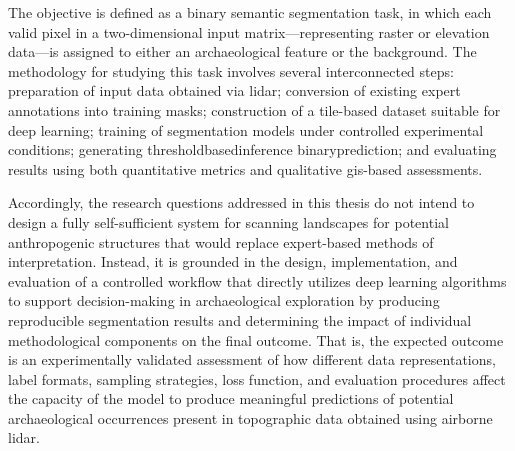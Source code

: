 The objective is defined as a binary semantic segmentation task, in which each valid pixel in a two-dimensional input matrix—representing raster or elevation data—is assigned to either an archaeological feature or the background. The methodology for studying this task involves several interconnected steps: preparation of input data obtained via \gls{lidar}; conversion of existing expert annotations into training masks; construction of a tile-based dataset suitable for deep learning; training of segmentation models under controlled experimental conditions; generating \gls{thresholdbasedinference} \gls{binaryprediction}; and evaluating results using both quantitative metrics and qualitative \gls{gis}-based assessments.

Accordingly, the research questions addressed in this thesis do not intend to design a fully self-sufficient system for scanning landscapes for potential anthropogenic structures that would replace expert-based methods of interpretation. Instead, it is grounded in the design, implementation, and evaluation of a controlled workflow that directly utilizes deep learning algorithms to support decision-making in archaeological exploration by producing reproducible segmentation results and determining the impact of individual methodological components on the final outcome. That is, the expected outcome is an experimentally validated assessment of how different data representations, label formats, sampling strategies, loss function, and evaluation procedures affect the capacity of the model to produce meaningful predictions of potential archaeological occurrences present in topographic data obtained using airborne \gls{lidar}.
